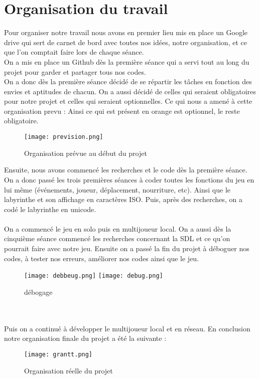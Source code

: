 ﻿\documentclass[12pt,a4paper,twoside]{article}
\begin{document}
\section{Organisation du travail}
Pour organiser notre travail nous avons en premier lieu mis en place un Google drive qui sert de carnet de bord avec toutes nos idées, notre organisation, et ce que l'on comptait faire lors de chaque séance.\\
On a mis en place un Github dès la première séance qui a servi tout au long du projet pour garder et partager tous nos codes.
\\On a donc dès la première séance décidé de se répartir les tâches en fonction des envies et aptitudes de chacun. On a aussi décidé de celles qui seraient obligatoires pour notre projet et celles qui seraient optionnelles. Ce qui nous a amené à cette organisation prevu :
Ainsi ce qui est présent en orange est optionnel, le reste obligatoire. \\
\begin {figure}[h]
\texttt{[image: prevision.png]}
\caption{\label {ref2}Organisation prévue au début du projet}
\end {figure}

Ensuite, nous avons commencé les recherches et le code dès la première séance.
On a donc passé les trois premières séances à coder toutes les fonctions du jeu en lui même (événements, joueur, déplacement, nourriture, etc). Ainsi que le labyrinthe et son affichage en caractères ISO.
Puis, après des recherches, on a codé le labyrinthe en unicode.
\\
\\
On a commencé le jeu en solo puis en multijoueur local. On a aussi dès la cinquième séance commencé les recherches concernant la SDL et ce qu'on pourrait faire avec notre jeu. Ensuite on a passé la fin du projet à déboguer nos codes, à tester nos erreurs, améliorer nos codes ainsi que le jeu.
\begin {figure}[h]
\texttt{[image: debbeug.png]}
\hspace{100pt}
\texttt{[image: debug.png]}
\caption{\label {ref3}débogage}
\end {figure}
\\
\\
Puis on a continué à développer le multijoueur local et en réseau.
En conclusion notre organisation finale du projet a été la suivante :
\begin {figure}[h]
\texttt{[image: grantt.png]}
\caption{\label {ref4}Organisation réelle du projet}
\end {figure}
\newpage
\end{document}
